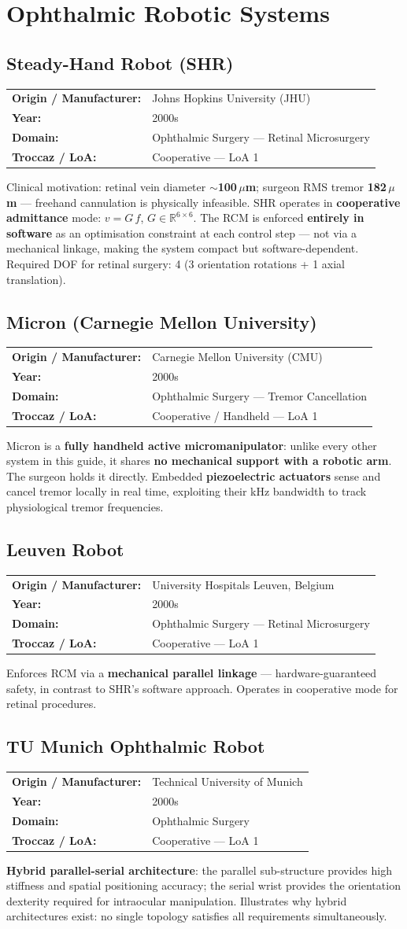 \documentclass[11pt,a4paper,twoside]{report}
\makeatletter
\newcommand{\robotmeta}[4]{%
  \noindent\begin{tabular}{@{}ll@{}}
    \textbf{Origin / Manufacturer:} & #1 \\
    \textbf{Year:}                  & #2 \\
    \textbf{Domain:}                & #3 \\
    \textbf{Troccaz / LoA:}         & #4 \\
  \end{tabular}\par\smallskip\noindent}
\makeatother
\begin{document}
\chapter{Ophthalmic Robotic Systems}

\section{Steady-Hand Robot (SHR)}
\robotmeta{Johns Hopkins University (JHU)}{2000s}{Ophthalmic Surgery — Retinal Microsurgery}{Cooperative — LoA 1}
Clinical motivation: retinal vein diameter $\sim$\textbf{100\,$\mu$m}; surgeon RMS tremor \textbf{182\,$\mu$m} — freehand cannulation is physically infeasible. SHR operates in \textbf{cooperative admittance} mode: $v = G\,f$, $G \in \mathbb{R}^{6\times6}$. The RCM is enforced \textbf{entirely in software} as an optimisation constraint at each control step — not via a mechanical linkage, making the system compact but software-dependent. Required DOF for retinal surgery: 4 (3 orientation rotations + 1 axial translation).

\section{Micron (Carnegie Mellon University)}
\robotmeta{Carnegie Mellon University (CMU)}{2000s}{Ophthalmic Surgery — Tremor Cancellation}{Cooperative / Handheld — LoA 1}
Micron is a \textbf{fully handheld active micromanipulator}: unlike every other system in this guide, it shares \textbf{no mechanical support with a robotic arm}. The surgeon holds it directly. Embedded \textbf{piezoelectric actuators} sense and cancel tremor locally in real time, exploiting their kHz bandwidth to track physiological tremor frequencies.

\section{Leuven Robot}
\robotmeta{University Hospitals Leuven, Belgium}{2000s}{Ophthalmic Surgery — Retinal Microsurgery}{Cooperative — LoA 1}
Enforces RCM via a \textbf{mechanical parallel linkage} — hardware-guaranteed safety, in contrast to SHR's software approach. Operates in cooperative mode for retinal procedures.

\section{TU Munich Ophthalmic Robot}
\robotmeta{Technical University of Munich}{2000s}{Ophthalmic Surgery}{Cooperative — LoA 1}
\textbf{Hybrid parallel-serial architecture}: the parallel sub-structure provides high stiffness and spatial positioning accuracy; the serial wrist provides the orientation dexterity required for intraocular manipulation. Illustrates why hybrid architectures exist: no single topology satisfies all requirements simultaneously.
\end{document}
